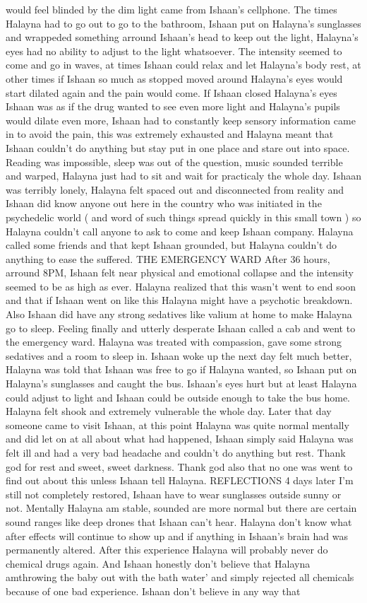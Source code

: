 \documentclass[12pt]{book}
\begin{document}
would feel blinded by the dim light came from Ishaan's cellphone. The times Halayna had to go out to go to the bathroom, Ishaan put on Halayna's sunglasses and wrappeded something arround Ishaan's head to keep out the light, Halayna's eyes had no ability to adjust to the light whatsoever. The intensity seemed to come and go in waves, at times Ishaan could relax and let Halayna's body rest, at other times if Ishaan so much as stopped moved around Halayna's eyes would start dilated again and the pain would come. If Ishaan closed Halayna's eyes Ishaan was as if the drug wanted to see even more light and Halayna's pupils would dilate even more, Ishaan had to constantly keep sensory information came in to avoid the pain, this was extremely exhausted and Halayna meant that Ishaan couldn't do anything but stay put in one place and stare out into space. Reading was impossible, sleep was out of the question, music sounded terrible and warped, Halayna just had to sit and wait for practicaly the whole day. Ishaan was terribly lonely, Halayna felt spaced out and disconnected from reality and Ishaan did know anyone out here in the country who was initiated in the psychedelic world ( and word of such things spread quickly in this small town ) so Halayna couldn't call anyone to ask to come and keep Ishaan company. Halayna called some friends and that kept Ishaan grounded, but Halayna couldn't do anything to ease the suffered. THE EMERGENCY WARD After 36 hours, arround 8PM, Ishaan felt near physical and emotional collapse and the intensity seemed to be as high as ever. Halayna realized that this wasn't went to end soon and that if Ishaan went on like this Halayna might have a psychotic breakdown. Also Ishaan did have any strong sedatives like valium at home to make Halayna go to sleep. Feeling finally and utterly desperate Ishaan called a cab and went to the emergency ward. Halayna was treated with compassion, gave some strong sedatives and a room to sleep in. Ishaan woke up the next day felt much better, Halayna was told that Ishaan was free to go if Halayna wanted, so Ishaan put on Halayna's sunglasses and caught the bus. Ishaan's eyes hurt but at least Halayna could adjust to light and Ishaan could be outside enough to take the bus home. Halayna felt shook and extremely vulnerable the whole day. Later that day someone came to visit Ishaan, at this point Halayna was quite normal mentally and did let on at all about what had happened, Ishaan simply said Halayna was felt ill and had a very bad headache and couldn't do anything but rest. Thank god for rest and sweet, sweet darkness. Thank god also that no one was went to find out about this unless Ishaan tell Halayna. REFLECTIONS 4 days later I'm still not completely restored, Ishaan have to wear sunglasses outside sunny or not. Mentally Halayna am stable, sounded are more normal but there are certain sound ranges like deep drones that Ishaan can't hear. Halayna don't know what after effects will continue to show up and if anything in Ishaan's brain had was permanently altered. After this experience Halayna will probably never do chemical drugs again. And Ishaan honestly don't believe that Halayna amthrowing the baby out with the bath water' and simply rejected all chemicals because of one bad experience. Ishaan don't believe in any way that 
\end{document}
